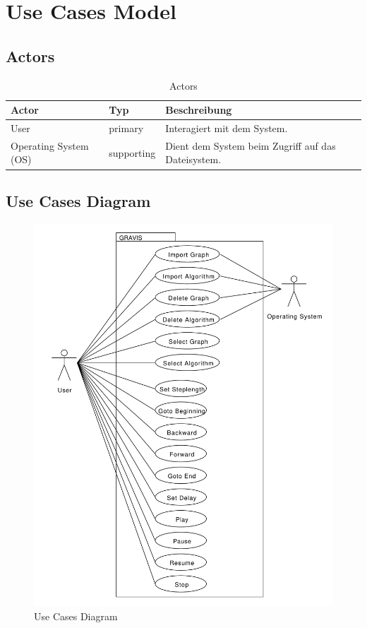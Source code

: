 \section{Use Cases Model}
\label{sec:Use Cases Model}
% 
\subsection{Actors}
\label{subsec:Actors}
\begin{table}[htp]
  \begin{tabular}[t]{|l|l|l|}\hline
	  \rowcolor{tcA}
	  Actor 			& Typ 		& Beschreibung \\\hline
	  User		 		& primary 	& Interagiert mit dem System. \\\hline
	  Operating System (OS) 	& supporting 	& Dient dem System beim Zugriff auf das Dateisystem. \\\hline
  \end{tabular}
  \caption{Actors}
  \label{tab:actors}
\end{table}

% 
\subsection{Use Cases Diagram}
\label{subsec:Use Cases Diagram}
\begin{figure}[H]
    \centering
    \includegraphics[scale=0.5]{diagrams/use-cases-diagram.pdf}
    \caption{Use Cases Diagram}
    \label{fig:use_cases_diagram}
\end{figure}
% 
